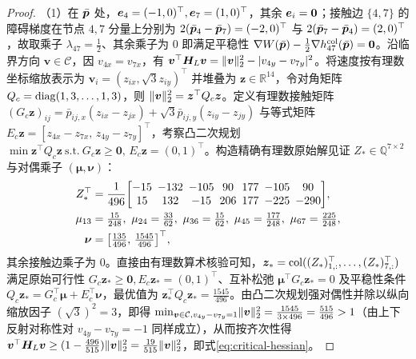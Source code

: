 \begin{proof}
（1）在 $\bar{\boldsymbol{p}}$ 处，$\boldsymbol{e}_4=(-1,0)^{\top},\boldsymbol{e}_7=(1,0)^{\top}$，其余 $\boldsymbol{e}_i=\boldsymbol 0$；接触边 $\{4,7\}$ 的障碍梯度在节点 $4,7$ 分量上分别为 $2(\bar{\boldsymbol{p}}_4-\bar{\boldsymbol{p}}_7)=(-2,0)^{\top}$ 与 $2(\bar{\boldsymbol{p}}_7-\bar{\boldsymbol{p}}_4)=(2,0)^{\top}$，故取乘子 $\lambda_{47}=\frac12$、其余乘子为 $0$ 即满足平稳性 $\nabla W(\bar{\boldsymbol{p}})-\frac12\nabla h_{47}^{\mathrm{col}}(\bar{\boldsymbol{p}})=\boldsymbol 0$。沿临界方向 $\boldsymbol v\in\mathcal C$，因 $v_{4x}=v_{7x}$，有 $\boldsymbol v^{\top}\boldsymbol H_L\boldsymbol v=\lVert\boldsymbol v\rVert_2^2-|v_{4y}-v_{7y}|^2$。将速度按有理数坐标缩放表示为 $\boldsymbol v_i=(z_{ix},\sqrt{3}z_{iy})^{\top}$ 并堆叠为 $\boldsymbol z\in\mathbb R^{14}$，令对角矩阵 $Q_c=\operatorname{diag}(1,3,\dots,1,3)$，则 $\lVert\boldsymbol v\rVert_2^2=\boldsymbol z^{\top}Q_c\boldsymbol z$。定义有理数接触矩阵 $(G_c\boldsymbol z)_{ij}=\bar p_{ij,x}(z_{ix}-z_{jx})+\sqrt{3}\bar p_{ij,y}(z_{iy}-z_{jy})$ 与等式矩阵 $E_c\boldsymbol z=[z_{4x}-z_{7x},\,z_{4y}-z_{7y}]^{\top}$，考察凸二次规划 $\min\boldsymbol z^{\top}Q_c\boldsymbol z\ \text{s.t.}\ G_c\boldsymbol z\ge\boldsymbol 0,\,E_c\boldsymbol z=(0,1)^{\top}$。构造精确有理数原始解见证 $Z_*\in\mathbb Q^{7\times 2}$ 与对偶乘子 $(\boldsymbol\mu,\boldsymbol\nu)$：
\begin{equation}
\begin{split}
 Z_*^{\top}&=\frac{1}{496}{\setlength{\arraycolsep}{2.5pt}\begin{bmatrix}
 -15 & -132 & -105 & 90 & 177 & -105 & 90\\
 15 & 132 & -15 & 206 & 177 & -225 & -290
 \end{bmatrix}},\\
 \mu_{13}&=\tfrac{15}{248},\ \mu_{24}=\tfrac{33}{62},\ \mu_{36}=\tfrac{15}{62},\ \mu_{45}=\tfrac{177}{248},\ \mu_{67}=\tfrac{225}{248},\\
 \boldsymbol\nu&=\big[\tfrac{135}{496},\,\tfrac{1545}{496}\big]^{\top},
\end{split}\label{eq:certificate-primal}
\end{equation}
其余接触边乘子为 $0$。直接由有理数算术核验可知，$\boldsymbol z_*=\operatorname{col}((Z_*)_{1,:}^{\top},\dots,(Z_*)_{7,:}^{\top})$ 满足原始可行性 $G_c\boldsymbol z_*\ge\boldsymbol 0,E_c\boldsymbol z_*=(0,1)^{\top}$、互补松弛 $\boldsymbol\mu^{\top}G_c\boldsymbol z_*=0$ 及平稳性条件 $Q_c\boldsymbol z_*=G_c^{\top}\boldsymbol\mu+E_c^{\top}\boldsymbol\nu$，最优值为 $\boldsymbol z_*^{\top}Q_c\boldsymbol z_*=\frac{1545}{496}$。由凸二次规划强对偶性并除以纵向缩放因子 $(\sqrt{3})^2=3$，即得 $\min_{\boldsymbol v\in\mathcal C,v_{4y}-v_{7y}=1}\lVert\boldsymbol v\rVert_2^2=\frac{1545}{3\times 496}=\frac{515}{496}>1$（由上下反射对称性对 $v_{4y}-v_{7y}=-1$ 同样成立），从而按齐次性得 $\boldsymbol v^{\top}\boldsymbol H_L\boldsymbol v\ge(1-\frac{496}{515})\lVert\boldsymbol v\rVert_2^2=\frac{19}{515}\lVert\boldsymbol v\rVert_2^2$，即式\eqref{eq:critical-hessian}。


\end{proof}
